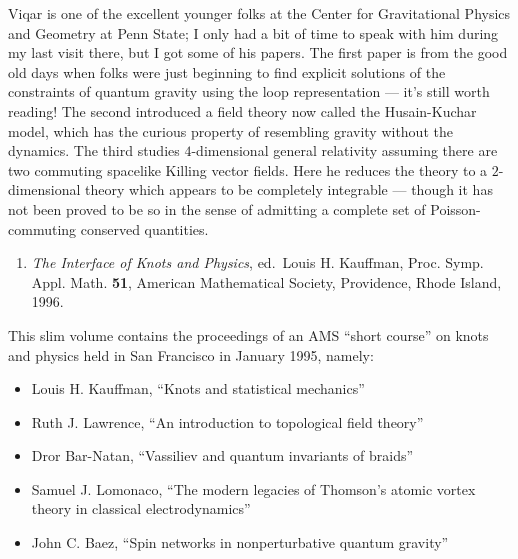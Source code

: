 \documentclass{article}
\def\tightlist{}
\renewcommand{\texttt}[1]{%
  \begingroup
  \ttfamily
  \begingroup\lccode`~=`/\lowercase{\endgroup\def~}{/\discretionary{}{}{}}%
  \begingroup\lccode`~=`[\lowercase{\endgroup\def~}{[\discretionary{}{}{}}%
  \begingroup\lccode`~=`.\lowercase{\endgroup\def~}{.\discretionary{}{}{}}%
  \catcode`/=\active\catcode`[=\active\catcode`.=\active
  \scantokens{#1\noexpand}%
  \endgroup
}
\begin{document}

Viqar is one of the excellent younger folks at the Center for
Gravitational Physics and Geometry at Penn State; I only had a bit of
time to speak with him during my last visit there, but I got some of his
papers. The first paper is from the good old days when folks were just
beginning to find explicit solutions of the constraints of quantum
gravity using the loop representation --- it's still worth reading! The
second introduced a field theory now called the Husain-Kuchar model,
which has the curious property of resembling gravity without the
dynamics. The third studies \(4\)-dimensional general relativity
assuming there are two commuting spacelike Killing vector fields. Here
he reduces the theory to a \(2\)-dimensional theory which appears to be
completely integrable --- though it has not been proved to be so in the
sense of admitting a complete set of Poisson-commuting conserved
quantities.

\begin{enumerate}
\def\labelenumi{\arabic{enumi})}
\setcounter{enumi}{7}
\tightlist
\item
  \emph{The Interface of Knots and Physics}, ed.~Louis H. Kauffman,
  Proc. Symp. Appl. Math. \textbf{51}, American Mathematical Society,
  Providence, Rhode Island, 1996.
\end{enumerate}

This slim volume contains the proceedings of an AMS ``short course'' on
knots and physics held in San Francisco in January 1995, namely:

\begin{itemize}
\tightlist
\item
  Louis H. Kauffman, ``Knots and statistical mechanics''
\item
  Ruth J. Lawrence, ``An introduction to topological field theory''
\item
  Dror Bar-Natan, ``Vassiliev and quantum invariants of braids''
\item
  Samuel J. Lomonaco, ``The modern legacies of Thomson's atomic vortex
  theory in classical electrodynamics''
\item
  John C. Baez, ``Spin networks in nonperturbative quantum gravity''
\end{itemize}
\end{document}
